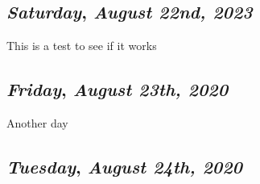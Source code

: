 \begin{center}
\section*{\month}
\end{center}

\def\day{\textit{August 22nd, 2023}}
\def\weekday{\textit{Saturday}}
\subsection*{\weekday, \day}

This is a test to see if it works

\def\day{\textit{August 23th, 2020}}
\def\weekday{\textit{Friday}}
\subsection*{\weekday, \day}

Another day

\def\day{\textit{August 24th, 2020}}
\def\weekday{\textit{Tuesday}}
\subsection*{\weekday, \day}
